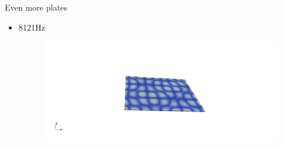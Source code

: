 \documentclass{beamer}[10pt]
\begin{document}
\begin{frame}{Even more plates}
\begin{itemize}
\item{
8121Hz
\begin{figure}
\centering
\includegraphics[scale=0.3, trim= 100mm 0mm 100mm 0mm, clip]{5a.png}
\end{figure}

}
\end{itemize}
\end{frame}
\end{document}
